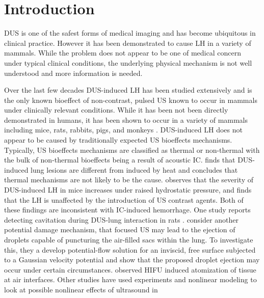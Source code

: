 \documentclass{jfm}%
\begin{document}
\begin{keywords}
\end{keywords}

\section{Introduction}%
\label{sec:introduction}%
% 
\ac{DUS} is one of the safest forms of medical imaging and has become
ubiquitous in clinical practice. However it has been demonstrated to
cause \ac{LH} in a variety of mammals. While the problem does not
appear to be one of medical concern under typical clinical conditions,
the underlying physical mechanism is not well understood and more
information is needed. 

Over the last few decades \ac{DUS}-induced \ac{LH} has been studied
extensively and is the only known bioeffect of non-contrast, pulsed
\ac{US} known to occur in mammals under clinically relevant
conditions. While it has been not been directly demonstrated in
humans, it has been shown to occur in a variety of mammals including
mice, rats, rabbits, pigs, and monkeys
\citep{Child1990,OBrien2006a,Tarantal1994a,Miller2012}.
\ac{DUS}-induced \ac{LH} does not appear to be caused by traditionally
expected \ac{US} bioeffects mechanisms. Typically, \ac{US} bioeffects
mechanisms are classified as thermal or non-thermal with the bulk of
non-thermal bioeffects being a result of acoustic
\ac{IC}. \cite{Zachary2006} finds that \ac{DUS}-induced lung lesions
are different from induced by heat and concludes that thermal
mechanisms are not likely to be the cause. \cite{OBrien2000} observes
that the severity of \ac{DUS}-induced \ac{LH} in mice increases under
raised hydrostatic pressure, and \cite{Raeman1996} finds that the
\ac{LH} is unaffected by the introduction of \ac{US} contrast
agents. Both of these findings are inconsistent with \ac{IC}-induced
hemorrhage. One study reports detecting cavitation during
\ac{DUS}-lung interaction in rats \cite{Holland1996}. \cite{Tjan2007}
consider another potential damage mechanism, that focused \ac{US} may
lead to the ejection of droplets capable of puncturing the air-filled
sacs within the lung. To investigate this, they a develop
potential-flow solution for an inviscid, free surface subjected to a
Gaussian velocity potential and show that the proposed droplet
ejection may occur under certain circumstances. \cite{Simon2012}
observed \ac{HIFU} induced atomization of tissue at air
interfaces. Other studies have used experiments and nonlinear modeling
to look at possible nonlinear effects of ultrasound in
\end{document}
